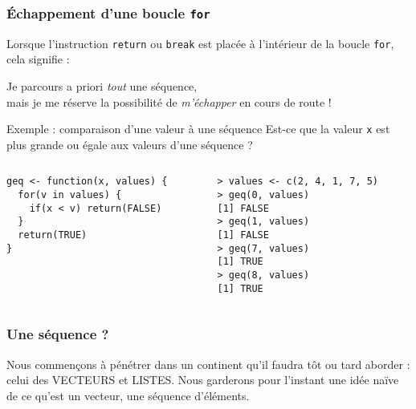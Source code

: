\documentclass[10pt]{beamer}
\begin{document}
\begin{frame}[fragile]
  \frametitle{Échappement d'une boucle \texttt{for}}
  Lorsque l'instruction \texttt{return} ou \texttt{break} est placée à l'intérieur de la boucle \texttt{for}, cela signifie :
  \begin{center}
    \alert{Je parcours a priori \emph{tout} une séquence,\\ mais je me réserve la possibilité de \emph{m'échapper} en cours de route !}

  \end{center}
\begin{exampleblock}{Exemple : comparaison d'une valeur à une séquence}
  Est-ce que la valeur \texttt{x} est plus grande ou égale aux valeurs d’une séquence ?
\begin{columns}[t]
\begin{column}{0.48\textwidth}
  \begin{lstlisting}[style=editor]
geq <- function(x, values) {
  for(v in values) {
    if(x < v) return(FALSE)
  }
  return(TRUE)
}         
  \end{lstlisting}
\end{column}
\begin{column}{0.48\textwidth}
  \begin{lstlisting}
> values <- c(2, 4, 1, 7, 5)
> geq(0, values)
[1] FALSE
> geq(1, values)
[1] FALSE
> geq(7, values)
[1] TRUE
> geq(8, values)
[1] TRUE
\end{lstlisting}

\end{column}
\end{columns}
\end{exampleblock}
\end{frame}

\begin{frame}
  \frametitle{Une séquence ?}
  Nous commençons à pénétrer dans un continent qu'il faudra tôt ou tard aborder : celui des \alert{VECTEURS} et \alert{LISTES}.
  Nous garderons pour l'instant une idée naïve de ce qu'est un vecteur, une \alert{séquence d’éléments}.
\end{frame}
\end{document}
